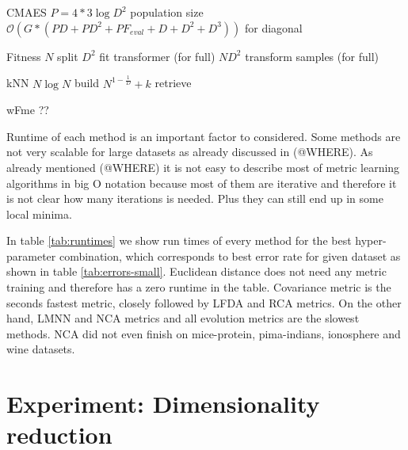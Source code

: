 \documentclass[12pt,a4paper]{report}
\begin{document}
CMAES
$P=4*3\log{D^2}$ population size
$\mathcal{O}(G*(PD+PD^2+PF_{eval}+D+D^2+D^3))$ for diagonal

Fitness
$N$ split
$D^2$ fit transformer (for full)
$ND^2$ transform samples (for full)

kNN
$N\log{N}$ build
$N^{1-\frac{1}{D}}+k$ retrieve

wFme ??


Runtime of each method is an important factor to considered. Some methods are not very scalable for large datasets as already discussed in (@WHERE). As already mentioned (@WHERE) it is not easy to describe most of metric learning algorithms in big O notation because most of them are iterative and therefore it is not clear how many iterations is needed. Plus they can still end up in some local minima.

In table \ref{tab:runtimes} we show run times of every method for the best hyper-parameter combination, which corresponds to best error rate for given dataset as shown in table \ref{tab:errors-small}. Euclidean distance does not need any metric training and therefore has a zero runtime in the table. Covariance metric is the seconds fastest metric, closely followed by LFDA and RCA metrics. On the other hand, LMNN and NCA metrics and all evolution metrics are the slowest methods. NCA did not even finish on mice-protein, pima-indians, ionosphere and wine datasets.




\section{Experiment: Dimensionality reduction} \label{chap:exp:dimred}
\end{document}
